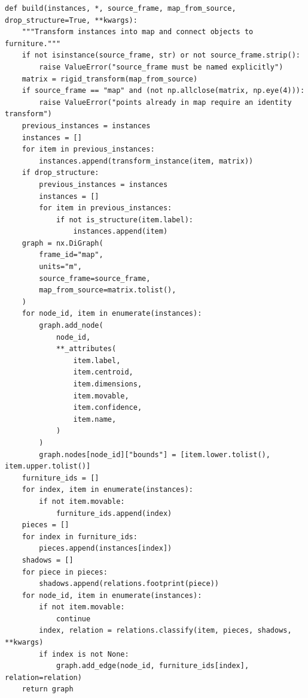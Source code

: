 \documentclass[11pt,a4paper]{book}
\begin{document}
\begin{lstlisting}[firstnumber=31]
def build(instances, *, source_frame, map_from_source, drop_structure=True, **kwargs):
    """Transform instances into map and connect objects to furniture."""
    if not isinstance(source_frame, str) or not source_frame.strip():
        raise ValueError("source_frame must be named explicitly")
    matrix = rigid_transform(map_from_source)
    if source_frame == "map" and (not np.allclose(matrix, np.eye(4))):
        raise ValueError("points already in map require an identity transform")
    previous_instances = instances
    instances = []
    for item in previous_instances:
        instances.append(transform_instance(item, matrix))
    if drop_structure:
        previous_instances = instances
        instances = []
        for item in previous_instances:
            if not is_structure(item.label):
                instances.append(item)
    graph = nx.DiGraph(
        frame_id="map",
        units="m",
        source_frame=source_frame,
        map_from_source=matrix.tolist(),
    )
    for node_id, item in enumerate(instances):
        graph.add_node(
            node_id,
            **_attributes(
                item.label,
                item.centroid,
                item.dimensions,
                item.movable,
                item.confidence,
                item.name,
            )
        )
        graph.nodes[node_id]["bounds"] = [item.lower.tolist(), item.upper.tolist()]
    furniture_ids = []
    for index, item in enumerate(instances):
        if not item.movable:
            furniture_ids.append(index)
    pieces = []
    for index in furniture_ids:
        pieces.append(instances[index])
    shadows = []
    for piece in pieces:
        shadows.append(relations.footprint(piece))
    for node_id, item in enumerate(instances):
        if not item.movable:
            continue
        index, relation = relations.classify(item, pieces, shadows, **kwargs)
        if index is not None:
            graph.add_edge(node_id, furniture_ids[index], relation=relation)
    return graph


\end{lstlisting}
\end{document}
